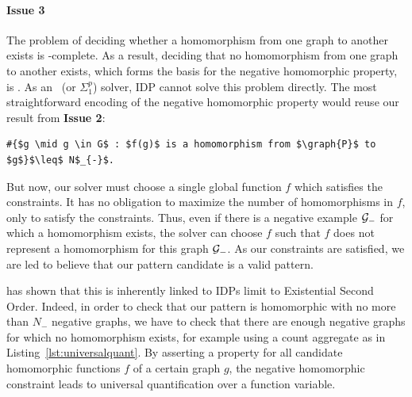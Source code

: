\paragraph{Issue 3} The problem of deciding whether a homomorphism from one graph to another exists is \NP-complete.
As a result, deciding that no homomorphism from one graph to another exists, which forms the basis for the negative homomorphic property, is \coNP.
As an \NP\ (or $\Sigma^{p}_{1}$) solver, IDP cannot solve this problem directly.
The most straightforward encoding of the negative homomorphic property would reuse our result from \textbf{Issue 2}:
\begin{center}
\begin{minipage}{0.61\linewidth}
\begin{lstlisting}[mathescape]
#{$g \mid g \in G$ : $f(g)$ is a homomorphism from $\graph{P}$ to $g$}$\leq$ N$_{-}$.
\end{lstlisting}
\end{minipage}
\end{center}
But now, our solver must choose a single global function $f$ which satisfies the constraints.
It has no obligation to maximize the number of homomorphisms in $f$, only to satisfy the constraints.
Thus, even if there is a negative example $\mathcal{G}_{-}$ for which a homomorphism exists, the solver can choose $f$ such that $f$ does not represent a homomorphism for this graph $\mathcal{G}_{-}$.
As our constraints are satisfied, we are led to believe that our pattern candidate is a valid pattern.

\citep{conf/fsttcs/Immerman98} has shown that this is inherently linked to IDPs limit to Existential Second Order.
Indeed, in order to check that our pattern  is homomorphic with no more than $N_{-}$ negative graphs, we have to check that there are enough negative graphs for which no homomorphism exists, for example using a count aggregate as in Listing~\ref{lst:universalquant}.
By asserting a property for all candidate homomorphic functions $f$ of a certain graph $g$, the negative homomorphic constraint leads to universal quantification over a function variable.

